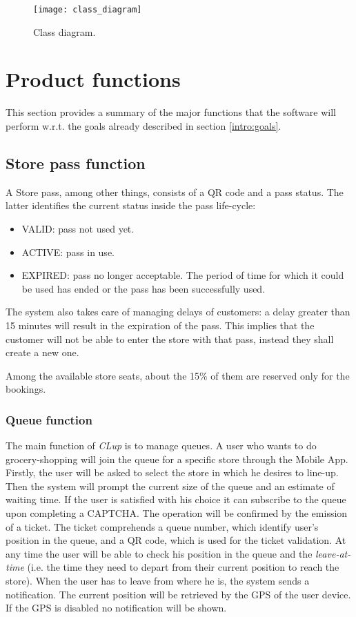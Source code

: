 \begin{figure}[H]
	\centering
	\texttt{[image: class\_diagram]}
	\caption{Class diagram.}
\end{figure}

\section{Product functions}\label{desc:prodFunc}
This section provides a summary of the major functions that the software will perform w.r.t. the goals already described in section \ref{intro:goals}.

\subsection{Store pass function}
	A Store pass, among other things, consists of a QR code and a pass status. The latter identifies the current status inside the pass life-cycle:
	\begin{itemize}
		\item VALID: pass not used yet.
		\item ACTIVE: pass in use.
		\item EXPIRED: pass no longer acceptable. The period of time for which it could be used has ended or the pass has been successfully used.
	\end{itemize}

	The system also takes care of managing delays of customers: a delay greater than 15 minutes will result in the expiration of the pass. This implies that the customer will not be able to enter the store with that pass, instead they shall create a new one.
	
	Among the available store seats, about the 15\% of them are reserved only for the bookings.

	\subsubsection{Queue function}
	The main function of \textit{CLup} is to manage queues. A user who wants to do grocery-shopping will join the queue for a specific store through the Mobile App.\newline
	Firstly, the user will be asked to select the store in which he desires to line-up.\newline
	Then the system will prompt the current size of the queue and an estimate of waiting time. If the user is satisfied with his choice it can subscribe to the queue upon completing a CAPTCHA. The operation will be confirmed by the emission of a ticket. The ticket comprehends a queue number, which identify user's position in the queue, and a QR code, which is used for the ticket validation. At any time the user will be able to check his position in the queue and the \textit{leave-at-time} (i.e. the time they need to depart from their current position to reach the store). When the user has to leave from where he is, the system sends a notification. The current position will be retrieved by the GPS of the user device. If the GPS is disabled no notification will be shown. 
	

